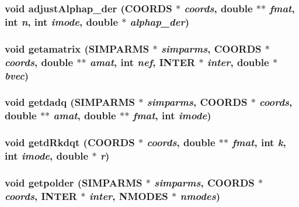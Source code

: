 \subsubsection{\setlength{\rightskip}{0pt plus 5cm}void adjust\-Alphap\_\-der ({\bf COORDS} $\ast$ {\em coords}, double $\ast$$\ast$ {\em fmat}, int {\em n}, int {\em imode}, double $\ast$ {\em alphap\_\-der})}\label{getpolder_8c_8803665c03bcf500f4a1f1913ce8960b}


\subsubsection{\setlength{\rightskip}{0pt plus 5cm}void getamatrix ({\bf SIMPARMS} $\ast$ {\em simparms}, {\bf COORDS} $\ast$ {\em coords}, double $\ast$$\ast$ {\em amat}, int {\em nef}, {\bf INTER} $\ast$ {\em inter}, double $\ast$ {\em bvec})}\label{getpolder_8c_7a3acedb9ccfe94a53905c1691cf1aa6}


\subsubsection{\setlength{\rightskip}{0pt plus 5cm}void getdadq ({\bf SIMPARMS} $\ast$ {\em simparms}, {\bf COORDS} $\ast$ {\em coords}, double $\ast$$\ast$ {\em amat}, double $\ast$$\ast$ {\em fmat}, int {\em imode})}\label{getpolder_8c_d95a07fa6d66214cccdc5e575727394c}


\subsubsection{\setlength{\rightskip}{0pt plus 5cm}void getd\-Rkdqt ({\bf COORDS} $\ast$ {\em coords}, double $\ast$$\ast$ {\em fmat}, int {\em k}, int {\em imode}, double $\ast$ {\em r})}\label{getpolder_8c_e3544c1fcb379dbfd114c63d3fc4e928}


\subsubsection{\setlength{\rightskip}{0pt plus 5cm}void getpolder ({\bf SIMPARMS} $\ast$ {\em simparms}, {\bf COORDS} $\ast$ {\em coords}, {\bf INTER} $\ast$ {\em inter}, {\bf NMODES} $\ast$ {\em nmodes})}\label{getpolder_8c_5b49bddcb4e09b5b855c52b6d73c5f47}


